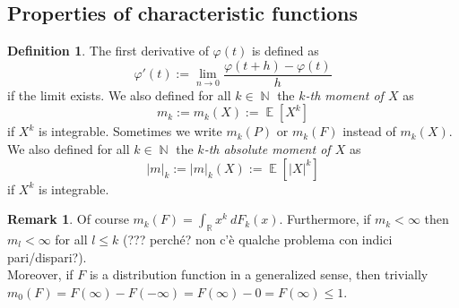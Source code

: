 \documentclass[12pt,a4paper]{report}
\theoremstyle{definition}
\newtheorem{definition}[theorem]{Definition}
\newtheorem*{remark}{Remark}
\theoremstyle{num.custom-title}
\DeclareMathOperator{\E}{\mathbb{E}}
\DeclareMathOperator{\N}{\mathbb{N}}
\DeclareMathOperator{\R}{\mathbb{R}}
\renewcommand{\phi}{\varphi}
\renewcommand{\1}{\mathbbm{1}}
\begin{document}
\subsection{Properties of characteristic functions}

\begin{definition}
The first derivative of $\phi(t)$ is defined as
\[
\phi'(t) := \lim_{n \to 0} \frac{\phi(t+h)-\phi(t)}{h}
\]
if the limit exists. We also defined for all $k \in \N$ the \emph{$k$-th moment of $X$} as
\[
m_k := m_k(X) := \E[X^k]
\]
if $X^k$ is integrable. Sometimes we write $m_k(P)$ or $m_k(F)$ instead of $m_k(X)$. We also defined for all $k \in \N$ the \emph{$k$-th absolute moment of $X$} as
\[
|m|_k := |m|_k(X) := \E[|X|^k]
\]
if $X^k$ is integrable.
\end{definition}

\begin{remark}
Of course $m_k(F) = \int_{\R} x^k \ dF_k(x)$. Furthermore, if $m_k < \infty$ then $m_l < \infty$ for all $l \leq k$ (??? perché? non c'è qualche problema con indici pari/dispari?).\\
Moreover, if $F$ is a distribution function in a generalized sense, then trivially $m_0(F)=F(\infty)-F(-\infty)=F(\infty)-0=F(\infty) \leq 1$.
\end{remark}
\end{document}
